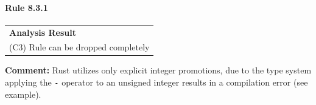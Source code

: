 \paragraph{Rule 8.3.1}
\begin{longtable}{p{13cm}}
\textbf{Analysis Result} \\
(C3) Rule can be dropped completely \\
\end{longtable}
\textbf{Comment:} Rust utilizes only explicit integer promotions, due to the type system applying the \texttt{-} operator to an unsigned integer results in a compilation error (see example). \\


